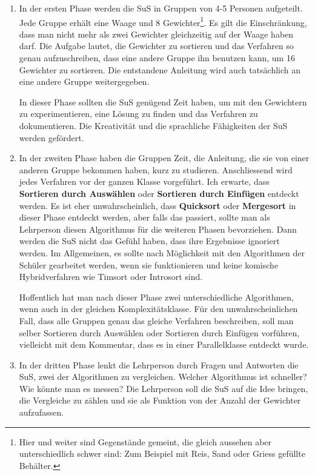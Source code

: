 \documentclass[
	12pt, %
	german, %
]{fphw}
\begin{document}
\begin{enumerate}[1.]
\item In der ersten Phase werden die SuS in Gruppen von 4-5 Personen aufgeteilt. Jede Gruppe erhält eine Waage und 8 Gewichter\footnote{Hier und weiter sind Gegenstände gemeint, die gleich aussehen aber unterschiedlich schwer sind: Zum Beispiel mit Reis, Sand oder Griess gefüllte Behälter.}. Es gilt die Einschränkung, dass man nicht mehr als zwei Gewichter gleichzeitig auf der Waage haben darf. Die Aufgabe lautet, die Gewichter zu sortieren und das Verfahren so genau aufzuschreiben, dass eine andere Gruppe ihn benutzen kann, um 16 Gewichter zu sortieren. Die entstandene Anleitung wird auch tatsächlich an eine andere Gruppe weitergegeben.

In dieser Phase sollten die SuS genügend Zeit haben, um mit den Gewichtern zu experimentieren, eine Lösung zu finden und das Verfahren zu dokumentieren. Die Kreativität und die sprachliche Fähigkeiten der SuS werden gefördert.

\item In der zweiten Phase haben die Gruppen Zeit, die Anleitung, die sie von einer anderen Gruppe bekommen haben, kurz zu studieren. Anschliessend wird jedes Verfahren vor der ganzen Klasse vorgeführt. Ich erwarte, dass \textbf{Sortieren durch Auswählen} oder \textbf{Sortieren durch Einfügen} entdeckt werden. Es ist eher unwahrscheinlich, dass \textbf{Quicksort}  oder \textbf{Mergesort} in dieser Phase entdeckt werden, aber falls das passiert, sollte man als Lehrperson diesen Algorithmus für die weiteren Phasen bevorziehen. Dann werden die SuS nicht das Gefühl haben, dass ihre Ergebnisse ignoriert werden. Im Allgemeinen, es sollte nach Möglichkeit mit den Algorithmen der Schüler gearbeitet werden, wenn sie funktionieren und keine komische Hybridverfahren wie Timsort oder Introsort sind.

Hoffentlich hat man nach dieser Phase zwei unterschiedliche Algorithmen, wenn auch in der gleichen Komplexitätsklasse. Für den unwahrscheinlichen Fall, dass alle Gruppen genau das gleiche Verfahren beschreiben, soll man selber Sortieren durch Auswählen oder Sortieren durch Einfügen vorführen, vielleicht mit dem Kommentar, dass es in einer Parallelklasse entdeckt wurde.

\item In der dritten Phase lenkt die Lehrperson durch Fragen und Antworten die SuS, zwei der Algorithmen zu vergleichen. Welcher Algorithmus ist schneller? Wie könnte man es messen? Die Lehrperson soll die SuS auf die Idee bringen, die Vergleiche zu zählen und sie als Funktion von der Anzahl der Gewichter aufzufassen.


\end{enumerate}
\end{document}
